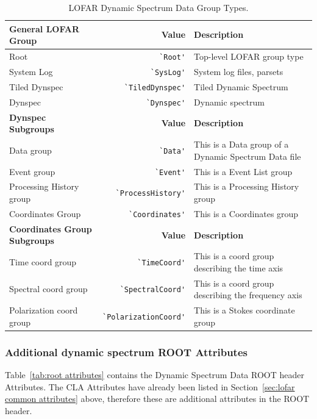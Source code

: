 \documentclass[a4paper,10pt,bibtotoc]{scrartcl}
\begin{document}
\begin{table}[ht]
  \centering
  \begin{tabular}{|lrp{6cm}|} 
    \hline
    \sc \textbf{General LOFAR Group} & \sc \textbf{Value} & \textbf{Description} \\
    \hline
    Root          & \verb|`Root'|    & Top-level LOFAR group type \\
    System Log    & \verb|`SysLog'|  & System log files, parsets \\
    Tiled Dynspec & \verb|`TiledDynspec'|& Tiled Dynamic Spectrum\\
    Dynspec & \verb|`Dynspec'|   & Dynamic spectrum \\
    \hline \hline
    \sc \textbf{Dynspec Subgroups} & \textbf{Value} & \textbf{Description} \\
    \hline
    Data group  & \verb|`Data'| & This is a Data group of a Dynamic Spectrum
    Data file \\
    Event group & \verb|`Event'| & This is a Event List group \\
    Processing History group &\verb|`ProcessHistory'| & This is a Processing History group \\
    Coordinates Group & \verb|`Coordinates'| & This is a Coordinates group \\
    \hline
    \sc \textbf{Coordinates Group Subgroups} & \textbf{Value} & \textbf{Description} \\
    \hline
    Time coord group      &\verb|`TimeCoord'|      & This is a coord group describing the time axis\\
    Spectral coord group    &\verb|`SpectralCoord'|    & This is a coord group describing the
    frequency axis\\
    Polarization coord group     &\verb|`PolarizationCoord'|  & This is a Stokes coordinate group \\
    \hline
  \end{tabular}
  \caption{LOFAR Dynamic Spectrum Data Group Types.}
  \label{tab:group types}
\end{table}


\subsubsection{Additional dynamic spectrum ROOT Attributes}
\label{sec:additional root group attributes}

Table~\ref{tab:root attributes} contains the Dynamic Spectrum Data ROOT header
Attributes.  The CLA Attributes have already been listed in
Section~\ref{sec:lofar common attributes} above, therefore these are additional
attributes in the ROOT header. 
\vspace{20pt}
\end{document}
